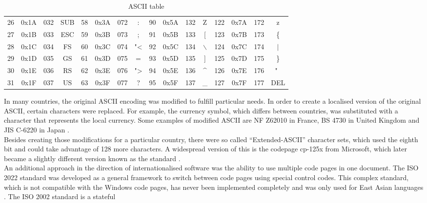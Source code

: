 \documentclass[a4paper, 12pt]{scrartcl} %
\begin{document}
\begin{itemize}
\begin{table}[H]
\begin{center}
{\begin{tabular}{|c|c|c|c||c|c|c|c||c|c|c|c||c|c|c|c|}
            26 & 0x1A & 032 & SUB & 58 & 0x3A & 072 & : & 90 & 0x5A & 132 & Z & 122 & 0x7A & 172 & z \\
            27 & 0x1B & 033 & ESC & 59 & 0x3B & 073 & ; & 91 & 0x5B & 133 & [ & 123 & 0x7B & 173 & \{ \\
            28 & 0x1C & 034 & FS & 60 & 0x3C & 074 & "< & 92 & 0x5C & 134 & $\backslash$ & 124 & 0x7C & 174 & $\mid$ \\
        29 & 0x1D & 035 & GS & 61 & 0x3D & 075 & = & 93 & 0x5D & 135 & ] & 125 & 0x7D & 175 & \} \\
            30 & 0x1E & 036 & RS & 62 & 0x3E & 076 & "> & 94 & 0x5E & 136 & \^{} & 126 & 0x7E & 176 & "~ \\
            31 & 0x1F & 037 & US & 63 & 0x3F & 077 & ? & 95 & 0x5F & 137 & \_ & 127 & 0x7F & 177 & DEL \\
            \hline
        \end{tabular}}
      \end{center}
      \caption{\gls{ASCII} table \cite{latexasciitable}}
      \label{table:asciitable}
    \end{table}
\end{itemize}
In many countries, the original \gls{ASCII} encoding was modified to fulfill
particular needs. In order to create a localised version of the original
\gls{ASCII}, certain characters were replaced. For example, the currency
symbol, which differs between countries, was substituted with a character that
represents the local currency. Some examples of modified \gls{ASCII} are NF
Z62010 in France, BS 4730 in United Kingdom and JIS C-6220 in Japan
\cite{haralambous2007fonts}. \\
Besides creating those modifications for a particular country, there were so
called ``Extended-\gls{ASCII}'' character sets, which used the eighth bit and
could take advantage of 128 more characters. A widespread version of this is
the codepage \gls{cp-125x} from Microsoft, which later became a slightly different
version known as the  standard \cite{korpela2006unicode}. \\
An additional approach in the direction of internationalised software was the
ability to use multiple code pages in one document. The ISO 2022 standard was
developed as a general framework to switch between code pages using special
control codes. This complex standard, which is not compatible with the Windows
code pages, has never been implemented completely and was only used for East
Asian languages \cite{korpela2006unicode}. The ISO 2002 standard is a stateful
\end{document}
